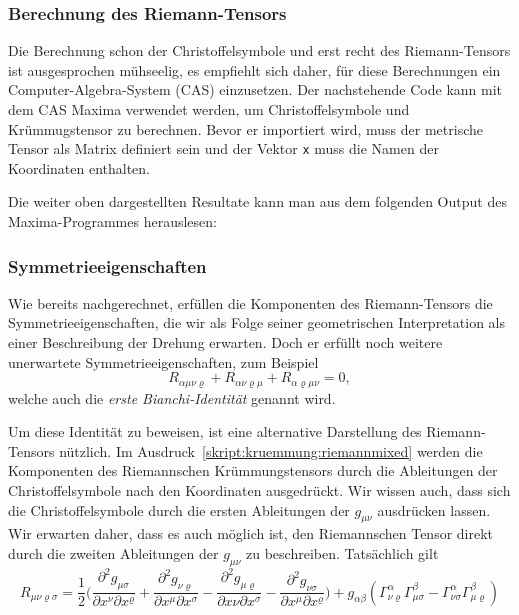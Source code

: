 \subsubsection{Berechnung des Riemann-Tensors}
Die Berechnung schon der Christoffelsymbole und erst recht des
Riemann-Tensors ist ausgesprochen mühseelig, es empfiehlt sich
daher, für diese Berechnungen ein Computer-Algebra-System (CAS) einzusetzen.
Der nachstehende Code kann mit dem CAS Maxima verwendet werden, um
Christoffelsymbole und Krümmugstensor zu berechnen.
Bevor er importiert wird, muss der metrische Tensor als Matrix
definiert sein und der Vektor {\tt x} muss die Namen der Koordinaten
enthalten.


\label{skript:maxima:curvature}

Die weiter oben dargestellten Resultate kann man aus dem folgenden Output
des Maxima-Programmes herauslesen:
{\small

}

\subsubsection{Symmetrieeigenschaften}
Wie bereits nachgerechnet, erfüllen die Komponenten des Riemann-Tensors
die Symmetrieeigenschaften, die wir als Folge seiner geometrischen
Interpretation als einer Beschreibung der Drehung erwarten.
Doch er erfüllt noch weitere unerwartete Symmetrieeigenschaften, zum
Beispiel
\begin{equation}
R_{\alpha\mu\nu\varrho}
+
R_{\alpha\nu\varrho\mu}
+
R_{\alpha\varrho\mu\nu}
=0,
\label{skript:kruemmung:bianchi1}
\end{equation}
welche auch die {\em erste Bianchi-Identität} genannt wird.

Um diese Identität zu beweisen, ist eine alternative Darstellung des
Riemann-Tensors nützlich. 
Im Ausdruck~\eqref{skript:kruemmung:riemannmixed} werden die Komponenten
des Riemannschen Krümmungstensors durch die Ableitungen der Christoffelsymbole
nach den Koordinaten ausgedrückt.
Wir wissen auch, dass sich die Christoffelsymbole durch die ersten Ableitungen
der $g_{\mu\nu}$ ausdrücken lassen.
Wir erwarten daher, dass es auch möglich ist, den Riemannschen Tensor direkt
durch die zweiten Ableitungen der $g_{\mu\nu}$ zu beschreiben.
Tatsächlich gilt
\begin{equation}
R_{\mu\nu\varrho\sigma}
=
\frac12\biggl(
\frac{\partial^2 g_{\mu\sigma}}{\partial x^\nu\partial x^\varrho}
+
\frac{\partial^2 g_{\nu\varrho}}{\partial x^\mu\partial x^\sigma}
-
\frac{\partial^2 g_{\mu\varrho}}{\partial x\nu\partial x^\sigma}
-
\frac{\partial^2 g_{\nu\sigma}}{\partial x^\mu\partial x^\varrho}
\biggr)
+g_{\alpha\beta}(
\Gamma^\alpha_{\nu\varrho}\Gamma^\beta_{\mu\sigma}
- \Gamma^\alpha_{\nu\sigma}\Gamma^\beta_{\mu\varrho}
)
\label{skript:kruemmung:riemann2abl}
\end{equation}

